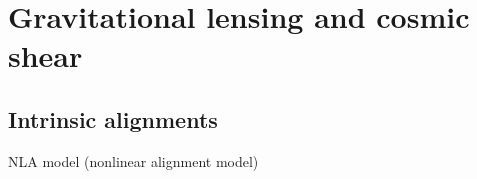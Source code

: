 \chapter{Gravitational lensing and cosmic shear}


\section{Intrinsic alignments}
NLA model (nonlinear alignment model)
